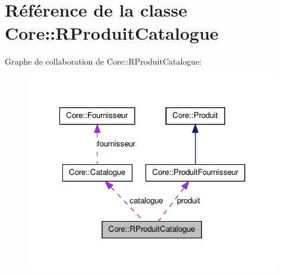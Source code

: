 \hypertarget{class_core_1_1_r_produit_catalogue}{
\section{Référence de la classe Core::RProduitCatalogue}
\label{dd/da1/class_core_1_1_r_produit_catalogue}
}


Graphe de collaboration de Core::RProduitCatalogue:\nopagebreak
\begin{figure}[H]
\begin{center}
\leavevmode
\includegraphics[width=313pt]{d8/da1/class_core_1_1_r_produit_catalogue__coll__graph}
\end{center}
\end{figure}
